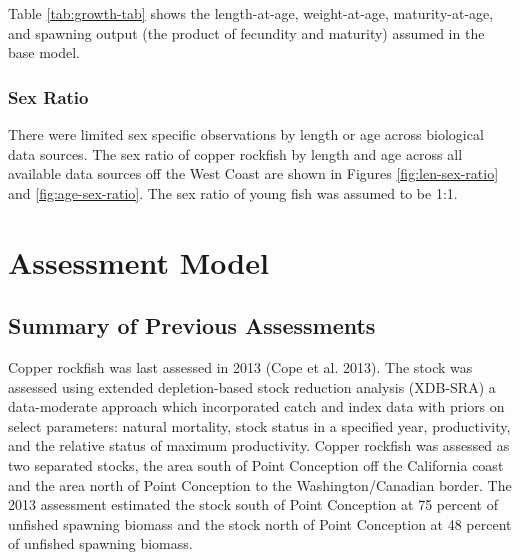\documentclass[11pt,
  english,
  a4paper,
]{article}
\begin{document}

Table \ref{tab:growth-tab} shows the length-at-age, weight-at-age, maturity-at-age, and spawning output (the product of fecundity and maturity) assumed in the base model.

\leavevmode\tagmcend\tagstructend\par


\hypertarget{sex-ratio}{%
\subsubsection{Sex Ratio}\label{sex-ratio}}

\leavevmode\tagmcend\tagstructend


There were limited sex specific observations by length or age across biological data sources. The sex ratio of copper rockfish by length and age across all available data sources off the West Coast are shown in Figures \ref{fig:len-sex-ratio} and \ref{fig:age-sex-ratio}. The sex ratio of young fish was assumed to be 1:1.

\leavevmode\tagmcend\tagstructend\par


\hypertarget{assessment-model}{%
\section{Assessment Model}\label{assessment-model}}

\leavevmode\tagmcend\tagstructend


\hypertarget{summary-of-previous-assessments}{%
\subsection{Summary of Previous Assessments}\label{summary-of-previous-assessments}}

\leavevmode\tagmcend\tagstructend


Copper rockfish was last assessed in 2013 {(Cope et al. 2013)\leavevmode\tagmcend\tagstructend}. The stock was assessed using extended depletion-based stock reduction analysis (XDB-SRA) a data-moderate approach which incorporated catch and index data with priors on select parameters: natural mortality, stock status in a specified year, productivity, and the relative status of maximum productivity. Copper rockfish was assessed as two separated stocks, the area south of Point Conception off the California coast and the area north of Point Conception to the Washington/Canadian border. The 2013 assessment estimated the stock south of Point Conception at 75 percent of unfished spawning biomass and the stock north of Point Conception at 48 percent of unfished spawning biomass.
\end{document}
